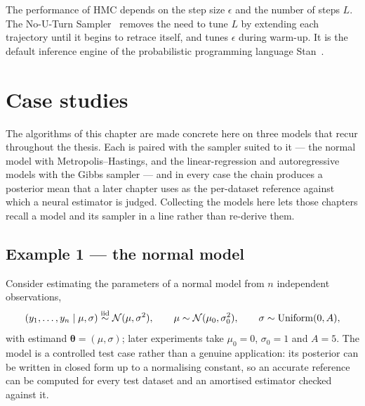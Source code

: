 The performance of HMC depends on the step size $\epsilon$ and the
number of steps $L$. The No-U-Turn Sampler~\citep{hoffman2014nuts}
removes the need to tune $L$ by extending each trajectory until it
begins to retrace itself, and tunes $\epsilon$ during warm-up. It is
the default inference engine of the probabilistic programming language
Stan~\citep{carpenter2017stan}.
\fi

\section{Case studies}
\label{sec:case-studies}

The algorithms of this chapter are made concrete here on three models
that recur throughout the thesis. Each is paired with the sampler
suited to it --- the normal model with Metropolis--Hastings, and the
linear-regression and autoregressive models with the Gibbs sampler ---
and in every case the chain produces a posterior mean that a later
chapter uses as the per-dataset reference against which a neural
estimator is judged. Collecting the models here lets those chapters
recall a model and its sampler in a line rather than re-derive them.

\subsection{Example 1 --- the normal model}
\label{sec:cs-normal}

Consider estimating the parameters of a normal model from $n$
independent observations,
%
\begin{equation}
  (y_1, \dots, y_n \mid \mu, \sigma) \overset{\text{iid}}{\sim} \mathcal{N}(\mu, \sigma^2),
  \qquad
  \mu \sim \mathcal{N}(\mu_0, \sigma_0^2),
  \qquad
  \sigma \sim \mathrm{Uniform}(0, A),
  \label{eq:normal-model}
\end{equation}
%
with estimand $\bm{\theta} = (\mu, \sigma)$; later experiments take
$\mu_0 = 0$, $\sigma_0 = 1$ and $A = 5$. The model is a controlled test case rather than a genuine
application: its posterior can be written in closed form up to a
normalising constant, so an accurate reference can be computed for
every test dataset and an amortised estimator checked against it.

